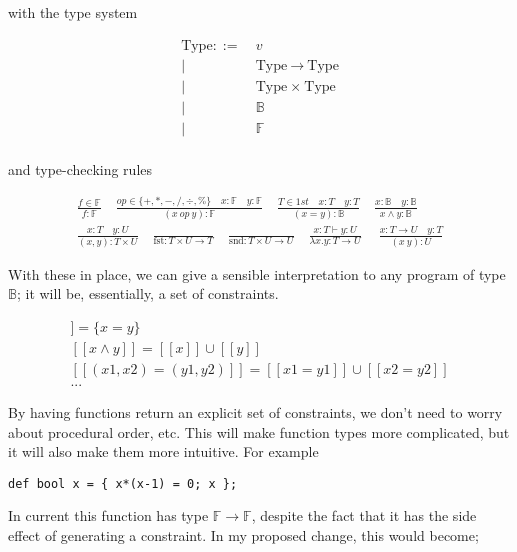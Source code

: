 \documentclass[
    9pt,            
    techreport,       
    affiltop,       
]{art}
\begin{document}
with the type system

\begin{align*}
    \text{Type} ::=&\ v \\
    |\ &\ \text{Type} \ \xrightarrow{} \ \text{Type} \\
    |\ &\ \text{Type} \ \times \ \text{Type} \\
    |\ &\ \mathbb{B} \\
    |\ &\ \mathbb{F} \\
\end{align*}

and type-checking rules

\begin{align*}
    \frac{f \in \mathbb{F}}{f : \mathbb{F}} \quad
    \frac{op \in \{+, *, -, /, \div, \% \} \quad x : \mathbb{F} \quad y : \mathbb{F} }{(x\ op\ y) : \mathbb{F}} \quad
    \frac{T \in 1st \quad x : T \quad y : T}{(x = y) : \mathbb{B}} \quad
    \frac{x : \mathbb{B} \quad y : \mathbb{B} }{x \wedge y : \mathbb{B}}\\
    \frac{x : T \quad y : U}{(x,y) : T \times U} \quad
    \frac{}{\text{fst} : T \times U \rightarrow T} \quad
    \frac{}{\text{snd} : T \times U \rightarrow U}\quad
    \frac{x : T \vdash y : U}{\lambda x.y : T \rightarrow U} \quad\
    \frac{x : T \rightarrow U \quad y : T}{(x\ y) : U} 
\end{align*}

With these in place, we can give a sensible interpretation to any program of type $\mathbb{B}$; it will be, essentially, a set of constraints.

\begin{align*}
    [[ x = y ]] = \{x = y\}\\
    [[ x \wedge y ]] = [[x]] \cup [[y]]\\
    [[ (x1, x2) = (y1, y2) ]] = [[x1 = y1]] \cup [[x2 = y2]]\\
    ...
\end{align*}

By having functions return an explicit set of constraints, we don't need to worry about procedural order, etc. This will make function types more complicated, but it will also make them more intuitive. For example

\begin{verbatim}
def bool x = { x*(x-1) = 0; x };
\end{verbatim}

In current \VampIR{} this function has type $\mathbb{F} \rightarrow \mathbb{F}$, despite the fact that it has the side effect of generating a constraint. In my proposed change, this would become;
\end{document}
